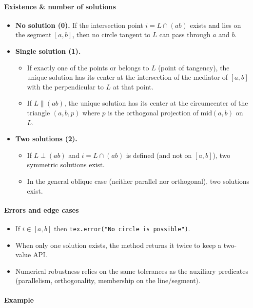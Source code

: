 \paragraph*{Existence \& number of solutions}
\begin{itemize}
  \item \textbf{No solution (0).} If the intersection point $i=L\cap (ab)$ exists and lies on the segment $[a,b]$, then no circle tangent to $L$ can pass through $a$ and $b$.
  \item \textbf{Single solution (1).}
    \begin{itemize}
      \item If exactly one of the points  or  belongs to $L$ (point of tangency), the unique solution has its center at the intersection of the mediator of $[a,b]$ with the perpendicular to $L$ at that point.
      \item If $L \parallel (ab)$, the unique solution has its center at the circumcenter of the triangle $(a,b,p)$ where $p$ is the orthogonal projection of $\mathrm{mid}(a,b)$ on $L$.
    \end{itemize}
  \item \textbf{Two solutions (2).}
    \begin{itemize}
      \item If $L \perp (ab)$ and $i=L\cap (ab)$ is defined (and not on $[a,b]$), two symmetric solutions exist.
      \item In the general oblique case (neither parallel nor orthogonal), two solutions exist.
    \end{itemize}
\end{itemize}

\medskip
\noindent
\paragraph*{Errors and edge cases}
\begin{itemize}
  \item If $i \in [a,b]$ then \verb|tex.error("No circle is possible")|.
  \item When only one solution exists, the method returns it twice to keep a two-value API.
  \item Numerical robustness relies on the same tolerances as the auxiliary predicates (parallelism, orthogonality, membership on the line/segment).
\end{itemize}

\paragraph*{Example}
\vspace{1em}

